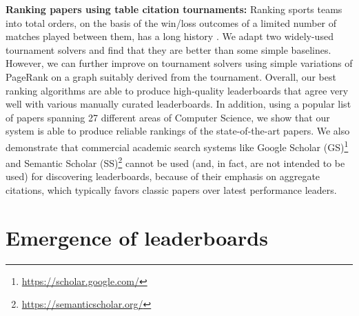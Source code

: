 \documentclass[runningheads]{llncs}
\begin{document}
\noindent \textbf{Ranking papers using table citation tournaments:}
Ranking sports teams into total orders, on the basis of the win/loss outcomes of a limited number of matches played between them, has a long history \cite{Jech1983Tournament,David1987Tournament,Redmond2003Tournament}.  We adapt two widely-used tournament solvers and find that they are better than some simple baselines.  However, we can further improve on tournament solvers using simple variations of PageRank \cite{PageBMW1998pagerank,xing2004weighted} on a graph suitably derived from the tournament.  Overall, our best ranking algorithms are able to produce high-quality leaderboards that agree very well with various manually curated leaderboards.  In addition, using a popular list of papers spanning 27 different areas of Computer Science, we show that our system is able to produce reliable rankings of the state-of-the-art papers. We also demonstrate that commercial academic search systems like Google Scholar (GS)\footnote{\protect\url{https://scholar.google.com/}} and Semantic Scholar (SS)\footnote{\protect\url{https://semanticscholar.org/}} cannot be used (and, in fact, are not intended to be used) for discovering leaderboards, because of their emphasis on aggregate citations, which typically favors classic papers over latest performance leaders.

\section{Emergence of leaderboards}
\label{leaderboard}
\end{document}
